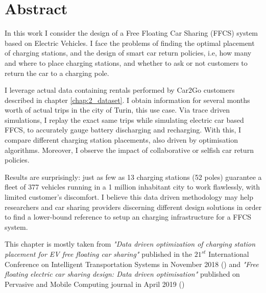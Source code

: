 \section{Abstract}

In this work I consider the design of a Free Floating Car Sharing (FFCS) system based on Electric Vehicles. I face the problems of finding the optimal placement of charging stations, and the design of smart car return policies, i.e, how many and where to place charging stations, and whether to ask or not customers to return the car to a charging pole.

I leverage actual data containing rentals performed by Car2Go customers described in chapter \ref{chap:2_dataset}. I obtain information for several months worth of actual trips in the city of Turin, this use case.
Via trace driven simulations, I replay the exact same trips while simulating electric car based FFCS, to accurately gauge battery discharging and recharging.
With this, I compare different charging station placements, also driven by optimisation algorithms. Moreover, I observe the impact of collaborative or selfish car return policies.

Results are surprisingly: just as few as 13 charging stations (52 poles) guarantee a fleet of 377 vehicles running in a 1 million inhabitant city to work flawlessly, with limited customer's discomfort.
I believe this data driven methodology may help researchers and car sharing providers discerning different design solutions in order to find a lower-bound reference to setup an charging infrastructure for a FFCS system.

This chapter is mostly taken from \textit{"Data driven optimization of charging station placement for EV free floating car sharing"} published in the $21^{st}$ International Conference on Intelligent Transportation Systems in November 2018 (\cite{maui}) and \textit{"Free floating electric car sharing design: Data driven optimisation"} published on Pervasive and Mobile Computing journal in April 2019 (\cite{coccaopt})
  